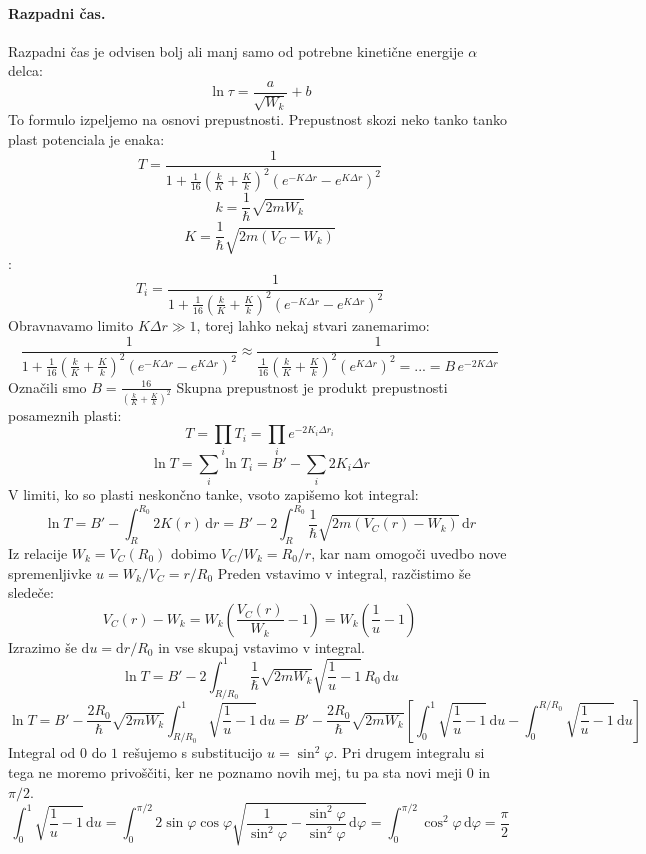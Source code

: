 \documentclass[a4paper]{article}
\newcommand{\dif}{\mathrm{d}}
\begin{document}
\paragraph{Razpadni čas.} Razpadni čas je odvisen bolj ali manj samo od potrebne kinetične energije \(\alpha\) delca:
\[\ln\tau = \frac{a}{\sqrt{W_k}} + b\]
To formulo izpeljemo na osnovi prepustnosti. Prepustnost skozi neko tanko tanko plast potenciala je enaka:
\[T = \frac{1}{1 + \frac{1}{16}\left(\frac{k}{K} + \frac{K}{k}\right)^2\left(e^{-K\Delta r} - e^{K\Delta r}\right)^2}\]
\[k = \frac{1}{\hbar}\sqrt{2mW_k}\]
\[K = \frac{1}{\hbar}\sqrt{2m(V_C - W_k)}\]:
\[T_i = \frac{1}{1 + \frac{1}{16}\left(\frac{k}{K} + \frac{K}{k}\right)^2\left(e^{-K\Delta r} - e^{K\Delta r}\right)^2}\]
Obravnavamo limito \(K\Delta r \gg 1\), torej lahko nekaj stvari zanemarimo:
\[\frac{1}{1 + \frac{1}{16}\left(\frac{k}{K} + \frac{K}{k}\right)^2\left(e^{-K\Delta r} - e^{K\Delta r}\right)^2} \approx \frac{1}{\frac{1}{16}\left(\frac{k}{K} + \frac{K}{k}\right)^2\left(e^{K\Delta r}\right)^2 = ... = B\,e^{-2K\Delta r}}\]
Označili smo \(\displaystyle{B = \frac{16}{\left(\frac{k}{K} + \frac{K}{k}\right)^2}}\)
Skupna prepustnost je produkt prepustnosti posameznih plasti:
\[T = \prod_{i}T_i = \prod_{i}e^{-2K_i\Delta r_i}\]
\[\ln T = \sum_{i}\ln T_i = B' - \sum_{i} 2K_i\Delta r\]
V limiti, ko so plasti neskončno tanke, vsoto zapišemo kot integral:
\[\ln T = B' - \int_{R}^{R_0}2K(r)\,\dif r = B' - 2\int_{R}^{R_0}\frac{1}{\hbar}\sqrt{2m(V_C(r) - W_k)}\,\dif r\]
Iz relacije \(W_k = V_C(R_0)\) dobimo \(V_C/W_k = R_0/r\), kar nam omogoči uvedbo nove spremenljivke \(u = W_k/V_C = r/R_0\)
Preden vstavimo v integral, razčistimo še sledeče:
\[V_C(r) - W_k = W_k\left(\frac{V_C(r)}{W_k} - 1\right) = W_k\left(\frac{1}{u} - 1\right)\]
Izrazimo še \(\dif u = \dif r / R_0\) in vse skupaj vstavimo v integral.
\[\ln T = B' - 2\int_{R/R_0}^{1} \frac{1}{\hbar}\sqrt{2mW_k}\sqrt{\frac{1}{u} - 1}\,R_0\,\dif u\]
\[\ln T = B' - \frac{2R_0}{\hbar}\sqrt{2mW_k}\int_{R/R_0}^{1}\sqrt{\frac{1}{u}-1}\,\dif u = B' - \frac{2R_0}{\hbar}\sqrt{2mW_k}\left[\int_{0}^{1}\sqrt{\frac{1}{u}-1}\,\dif u - \int_{0}^{R/R_0}\sqrt{\frac{1}{u}-1}\,\dif u\right]\]
Integral od \(0\) do \(1\) rešujemo s substitucijo \(u = \sin^2\varphi\). Pri drugem integralu si tega ne moremo privoščiti, ker ne poznamo novih mej, tu pa sta novi meji \(0\) in \(\pi/2\).
\[\int_{0}^{1} \sqrt{\frac{1}{u} - 1} \,\dif u = \int_{0}^{\pi/2}2\sin\varphi\cos\varphi\sqrt{\frac{1}{\sin^2\varphi} - \frac{\sin^2\varphi}{\sin^2\varphi}\,\dif\varphi} = \int_{0}^{\pi/2}\cos^2\varphi\,\dif\varphi = \frac{\pi}{2}\]
\end{document}
